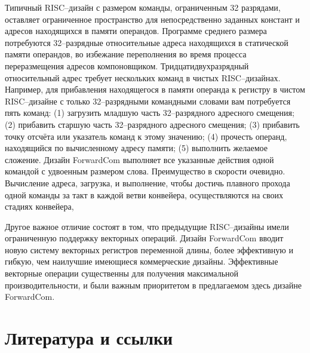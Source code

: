 \documentclass[forwardcom.tex]{subfiles}
\begin{document}
Типичный RISC--дизайн с размером команды, ограниченным 32 разрядами, оставляет ограниченное пространство для непосредственно заданных констант и адресов находящихся в памяти операндов. Программе среднего размера потребуются 32--разрядные относительные адреса находящихся в статической памяти операндов, во избежание переполнения во время процесса переразмещения адресов компоновщиком. Тридцатидвухразрядный относительный адрес требует нескольких команд в чистых RISC--дизайнах. Например, для прибавления находящегося в памяти операнда к регистру в чистом RISC--дизайне с только 32--разрядными командными словами вам потребуется пять команд: (1) загрузить младшую часть 32--разрядного адресного смещения; (2) прибавить старшую часть 32--разрядного адресного смещения; (3) прибавить точку отсчёта или указатель команд к этому значению; (4) прочесть операнд, находящийся по вычисленному адресу памяти; (5) выполнить желаемое сложение. Дизайн ForwardCom выполняет все указанные действия одной командой с удвоенным размером слова. Преимущество в скорости очевидно. Вычисление адреса, загрузка, и выполнение, чтобы достичь плавного прохода одной команды за такт в каждой ветви конвейера, осуществляются на своих стадиях конвейера, 

Другое важное отличие состоят в том, что предыдущие RISC--дизайны имели ограниченную поддержку векторных операций. Дизайн ForwardCom вводит новую систему векторных регистров переменной длины, более эффективную и гибкую, чем наилучшие имеющиеся коммерческие дизайны. Эффективные векторные операции существенны для получения максимальной производительности, и были важным приоритетом в предлагаемом здесь дизайне ForwardCom.

\section{Литература и ссылки} \label{referencesToIntroduction}
\end{document}
